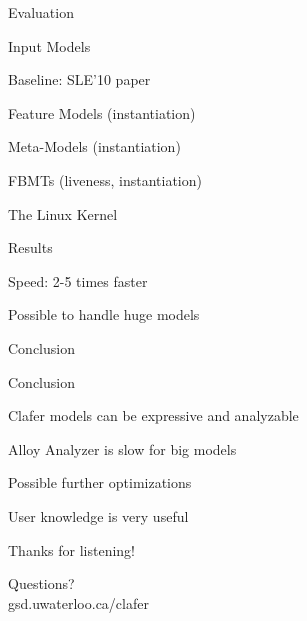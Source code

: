 \documentclass[table,15pt,t]{beamer}
\newcommand{\vmiddle}[1]{
  \vspace{\stretch{1}}
  #1
  \vspace{\stretch{1}}
}
\newcommand{\interframe}[1]{
\begin{frame}{}
\vmiddle{\hmiddle{\Huge #1}}
\end{frame}
}
\newcommand{\mlist}[1]{
\vmiddle{
  \begin{list}{}{}
    #1
  \end{list}
  }
}
\newcommand{\hmiddle}[1]{
  \begin{center}#1\end{center}
}
\newcounter{i}
\begin{document}
\interframe{Evaluation}

\begin{frame}{Input Models}
 \mlist{
    \item Baseline: SLE'10 paper\pause
    \item Feature Models (instantiation)
    \item Meta-Models (instantiation)
    \item FBMTs (liveness, instantiation)\pause
    \item The Linux Kernel
 }
\end{frame}

\begin{frame}{Results}
 \mlist{
    \item Speed: 2-5 times faster
    \item Possible to handle huge models
 }
\end{frame}

\interframe{Conclusion}

\begin{frame}{Conclusion}
 \mlist{
    \item Clafer models can be expressive and analyzable
    \item Alloy Analyzer is slow for big models
    \item Possible further optimizations
    \item User knowledge is very useful
 }
\end{frame}

\interframe{Thanks for listening!}

\interframe{Questions?\\[1cm]\normalsize{\textsf{gsd.uwaterloo.ca/clafer}}}
\end{document}
